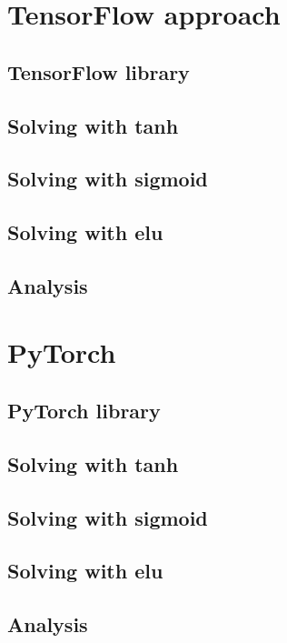 \section{TensorFlow approach}
\subsection{TensorFlow library}
\subsection{Solving with tanh}



\subsection{Solving with sigmoid}



\subsection{Solving with elu}


\subsection{Analysis}


\section{PyTorch}
\subsection{PyTorch library}



\subsection{Solving with tanh}



\subsection{Solving with sigmoid}



\subsection{Solving with elu}




\subsection{Analysis}
